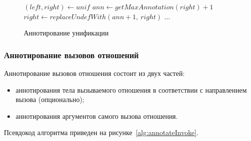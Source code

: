 \begin{figure}[h!]
  \begin{center}
  \begin{minipage}{1\textwidth}
\begin{algorithm}[H]
  \begin{algorithmic}
        \State $(left,right) \gets unif$
            \State $ann \gets getMaxAnnotation(right) + 1$
          \EndCase
            \State $right \gets replaceUndefWith(ann + 1,~right)$
          \EndCase
          \Otherwise
            \State $\dots$ 
          \EndOtherwise
        \EndSwitch
      \EndFunction
  \end{algorithmic}
\end{algorithm}
  \end{minipage}
  \end{center}
  \caption{Аннотирование унификации}
  \label{alg:annotateUnification}
\end{figure}



\subsubsection{Аннотирование вызовов отношений}

Аннотирование вызовов отношения состоит из двух частей:
\begin{itemize}
    \item аннотирования тела вызываемого отношения в соответствии с направлением вызова (опционально);
    \item аннотирования аргументов самого вызова отношения.
\end{itemize}
Псевдокод алгоритма приведен на рисунке~\ref{alg:annotateInvoke}.

